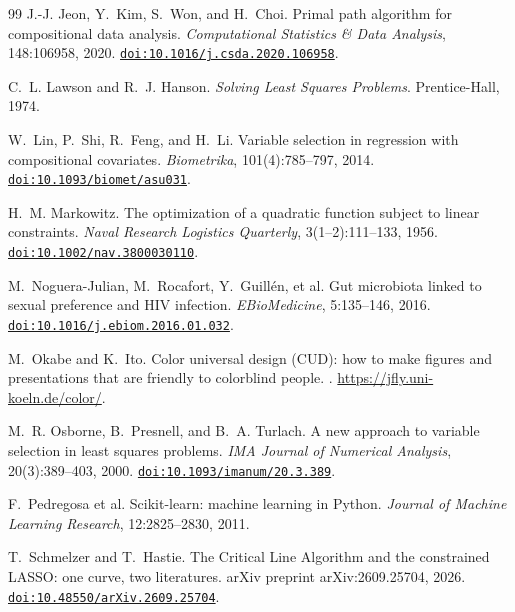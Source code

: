 \documentclass[11pt]{article}
\theoremstyle{remark}
\begin{document}
\begin{thebibliography}{99}
J.-J. Jeon, Y.~Kim, S.~Won, and H.~Choi.
\newblock Primal path algorithm for compositional data analysis.
\newblock \emph{Computational Statistics \& Data Analysis}, 148:106958, 2020.
\newblock \href{https://doi.org/10.1016/j.csda.2020.106958}{\texttt{doi:10.1016/j.csda.2020.106958}}.


C.~L. Lawson and R.~J. Hanson.
\newblock \emph{Solving Least Squares Problems}.
\newblock Prentice-Hall, 1974.

W.~Lin, P.~Shi, R.~Feng, and H.~Li.
\newblock Variable selection in regression with compositional covariates.
\newblock \emph{Biometrika}, 101(4):785--797, 2014.
\newblock \href{https://doi.org/10.1093/biomet/asu031}{\texttt{doi:10.1093/biomet/asu031}}.


H.~M. Markowitz.
\newblock The optimization of a quadratic function subject to linear constraints.
\newblock \emph{Naval Research Logistics Quarterly}, 3(1--2):111--133, 1956.
\newblock \href{https://doi.org/10.1002/nav.3800030110}{\texttt{doi:10.1002/nav.3800030110}}.


M.~Noguera-Julian, M.~Rocafort, Y.~Guill\'en, et al.
\newblock Gut microbiota linked to sexual preference and {HIV} infection.
\newblock \emph{EBioMedicine}, 5:135--146, 2016.
\newblock \href{https://doi.org/10.1016/j.ebiom.2016.01.032}{\texttt{doi:10.1016/j.ebiom.2016.01.032}}.


M.~Okabe and K.~Ito.
\newblock Color universal design ({CUD}): how to make figures and presentations that
are friendly to colorblind people.
. \url{https://jfly.uni-koeln.de/color/}.

M.~R. Osborne, B.~Presnell, and B.~A. Turlach.
\newblock A new approach to variable selection in least squares problems.
\newblock \emph{IMA Journal of Numerical Analysis}, 20(3):389--403, 2000.
\newblock \href{https://doi.org/10.1093/imanum/20.3.389}{\texttt{doi:10.1093/imanum/20.3.389}}.


F.~Pedregosa et al.
\newblock Scikit-learn: machine learning in Python.
\newblock \emph{Journal of Machine Learning Research}, 12:2825--2830, 2011.

T.~Schmelzer and T.~Hastie.
\newblock The Critical Line Algorithm and the constrained LASSO: one curve, two
literatures.
\newblock arXiv preprint arXiv:2609.25704, 2026.
\newblock \href{https://doi.org/10.48550/arXiv.2609.25704}{\texttt{doi:10.48550/arXiv.2609.25704}}.



\end{thebibliography}
\end{document}
